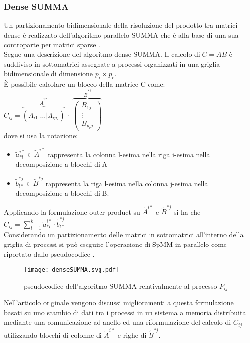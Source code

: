 \subsubsection{Dense SUMMA} %
Un partizionamento bidimensionale della risoluzione del prodotto tra matrici
dense è realizzato dell'algoritmo parallelo SUMMA  che è alla
base di una sua controparte per matrici sparse .\\
Segue una descrizione del algoritmo dense SUMMA.
\voidLine
Il calcolo di $C=AB$ è suddiviso in sottomatrici assegnate a processi organizzati 
in una griglia bidimensionale di dimensione  $p_r \times p_c$.\\
È possibile calcolare un blocco della matrice C come:
$C_{ij} =  \overbrace{\left(  A_{i1} | \dots |  A_{ip_c} \right)}^{\tilde{A}^{i*} }
~\cdot~ \overbrace{\left( 
        \begin{array}{c} B_{1j} \\ \vdots \\  B_{p_r j}
        \end{array} \right)} ^{\tilde{B}^{*j}} $\\
dove si usa la notazione:
\begin{itemize}
  \item $\tilde{a}_{*l}^{i*} \in \tilde{A}^{i*}$ rappresenta 
    la colonna l-esima nella riga i-esima nella decomposizione a blocchi di A
  \item $\tilde{b}_{l*}^{*j} \in  \tilde{B}^{*j}$ rappresenta 
    la riga l-esima nella colonna j-esima nella decomposizione a blocchi di B.
\end{itemize}  
Applicando la formulazione outer-product su $\tilde{A}^{i*}$ e $\tilde{B}^{*j}$
si ha che $C_{ij}=\sum\limits_{l=1}^{k}\tilde{a}_{*l}^{i*} \cdot \tilde{b}_{l*}^{*j}$\\
Considerando un partizionamento delle matrici in sottomatrici all'interno della
griglia di processi %
si può eseguire l'operazione di SpMM in parallelo come riportato dallo pseudocodice .\\
\begin{figure}[H]
  \centering \texttt{[image: denseSUMMA.svg.pdf]}
  \caption[pseudocodice dense SUMMA]{pseudocodice dell'algoritmo SUMMA relativalmente al processo $P_{ij}$} \decoRule \label{figCode:denseSUMMA}
\end{figure}
Nell'articolo originale vengono discussi miglioramenti a questa formulazione
basati su uno scambio di dati tra i processi in un sistema a memoria distribuita
mediante una comunicazione ad anello 
ed una riformulazione del calcolo di $C_{ij}$ utilizzando blocchi di
colonne di $\tilde{A}^{i*}$ e righe di $\tilde{B}^{*j}$.\\

